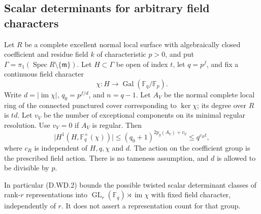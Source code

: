 \subsection{Scalar determinants for arbitrary field characters}

\begin{lemma}
\label{D:arbitrary-field-character-scalar-H1}
Let $R$ be a complete excellent normal local surface with
algebraically closed coefficient and residue field $k$ of
characteristic $p>0$, and put
$\Gamma=\pi_1(\operatorname{Spec}R\setminus\{\mathfrak m\})$.
Let $H\subset\Gamma$ be open of index $t$, let $q=p^f$,
and fix a continuous field character
\[
 \chi:H\longrightarrow\operatorname{Gal}(\mathbb F_q/\mathbb F_p).
                                                               \tag{D.WD.1}
\]
Write $d=|\operatorname{im}\chi|$, $q_0=p^{f/d}$, and
$n=q-1$. Let $A_V$ be the normal complete local ring of
the connected punctured cover corresponding to $\ker\chi$;
its degree over $R$ is $td$. Let $v_V$ be the number of
exceptional components on its minimal regular resolution.
Use $v_V=0$ if $A_V$ is regular. Then
\[
 \bigl|H^1(H,\mathbb F_q^{\times}(\chi))\bigr|
       \le(q_0+1)^{2p_g(A_V)+v_V}
       \le q^{c_Rt},                                    \tag{D.WD.2}
\]
where $c_R$ is independent of $H,q,\chi$ and $d$.
The action on the coefficient group is the prescribed field
action. There is no tameness assumption, and $d$ is allowed
to be divisible by $p$.

In particular (D.WD.2) bounds the possible twisted scalar
determinant classes of rank-$r$ representations into
$\operatorname{GL}_r(\mathbb F_q)\rtimes\operatorname{im}\chi$
with fixed field character, independently of $r$.
It does not assert a representation count for that group.
\end{lemma}

